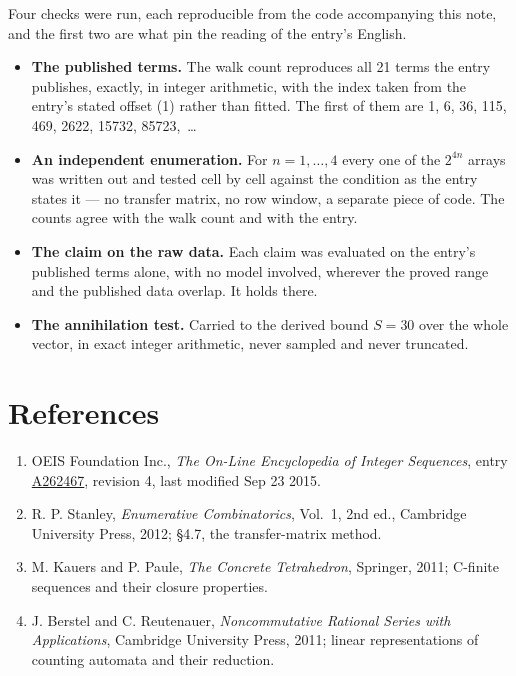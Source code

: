 \documentclass[11pt]{article}
\theoremstyle{definition}
\begin{document}
Four checks were run, each reproducible from the code accompanying this note, and the first two are what pin the reading of the entry's English.

\begin{itemize}

\item {\bfseries The published terms.} The walk count reproduces all 21 terms the entry publishes, exactly, in integer arithmetic, with the index taken from the entry's stated offset (1) rather than fitted. The first of them are 1, 6, 36, 115, 469, 2622, 15732, 85723,~\dots

\item {\bfseries An independent enumeration.} For $n = 1,\dots,4$ every one of the $2^{4n}$ arrays was written out and tested cell by cell against the condition as the entry states it --- no transfer matrix, no row window, a separate piece of code. The counts agree with the walk count and with the entry.

\item {\bfseries The claim on the raw data.} Each claim was evaluated on the entry's published terms alone, with no model involved, wherever the proved range and the published data overlap. It holds there.

\item {\bfseries The annihilation test.} Carried to the derived bound $S = 30$ over the whole vector, in exact integer arithmetic, never sampled and never truncated.

\end{itemize}

\section{References}

\begin{enumerate}

\item OEIS Foundation Inc., \emph{The On-Line Encyclopedia of Integer Sequences}, entry \href{https://oeis.org/A262467}{A262467}, revision 4, last modified Sep 23 2015.

\item R. P. Stanley, \emph{Enumerative Combinatorics}, Vol.~1, 2nd ed., Cambridge University Press, 2012; \S4.7, the transfer-matrix method.

\item M. Kauers and P. Paule, \emph{The Concrete Tetrahedron}, Springer, 2011; C-finite sequences and their closure properties.

\item J. Berstel and C. Reutenauer, \emph{Noncommutative Rational Series with Applications}, Cambridge University Press, 2011; linear representations of counting automata and their reduction.

\end{enumerate}
\end{document}
